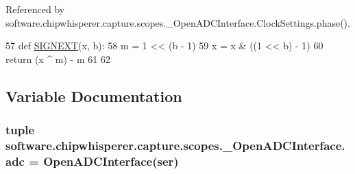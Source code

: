 Referenced by software.\+chipwhisperer.\+capture.\+scopes.\+\_\+\+Open\+A\+D\+C\+Interface.\+Clock\+Settings.\+phase().


\begin{DoxyCode}
57 \textcolor{keyword}{def }\hyperlink{namespacesoftware_1_1chipwhisperer_1_1capture_1_1scopes_1_1__OpenADCInterface_a8492be3724e2097930d1a8938d3688d0}{SIGNEXT}(x, b):
58     m = 1 << (b - 1)
59     x = x & ((1 << b) - 1)
60     \textcolor{keywordflow}{return} (x ^ m) - m
61 
62 
\end{DoxyCode}


\subsection{Variable Documentation}
\hypertarget{namespacesoftware_1_1chipwhisperer_1_1capture_1_1scopes_1_1__OpenADCInterface_a9255da00a56deb4fa82a89ecf5de8768}{}
\subsubsection[{adc}]{\setlength{\rightskip}{0pt plus 5cm}tuple software.\+chipwhisperer.\+capture.\+scopes.\+\_\+\+Open\+A\+D\+C\+Interface.\+adc = {\bf Open\+A\+D\+C\+Interface}({\bf ser})}\label{namespacesoftware_1_1chipwhisperer_1_1capture_1_1scopes_1_1__OpenADCInterface_a9255da00a56deb4fa82a89ecf5de8768}
\hypertarget{namespacesoftware_1_1chipwhisperer_1_1capture_1_1scopes_1_1__OpenADCInterface_a196975964d74c3d588eac5731fee0779}{}
